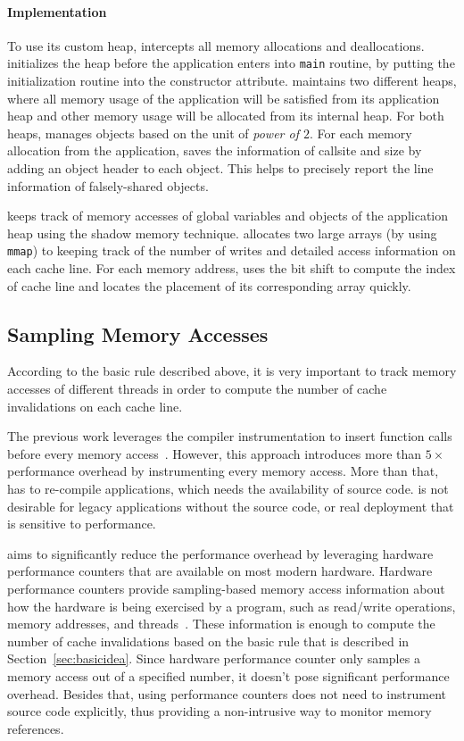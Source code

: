 \paragraph{Implementation} 
To use its custom heap, \cheetah{} intercepts all memory allocations and deallocations. \cheetah{} initializes the heap before the application enters into \texttt{main} routine, by putting the initialization routine into the constructor attribute. \cheetah{} maintains two different heaps, where all memory usage of the application will be satisfied from its application heap and other memory usage will be allocated from its  internal heap. For both heaps, \cheetah{} manages objects based on the unit of {\it power of $2$}. For each memory allocation from the application, \cheetah{} saves the information of callsite and size by adding an object header to each object. This helps \cheetah{} to precisely report the line information of falsely-shared objects.  

\cheetah{} keeps track of memory accesses of global variables and objects of the application heap using the shadow memory technique. \Cheetah{} allocates two large arrays (by using \texttt{mmap}) to keeping track of the number of writes and detailed access information on each cache line. For each memory address, \cheetah{} uses the bit shift to compute the index of cache line and locates the placement of its corresponding array quickly. 

\subsection{Sampling Memory Accesses}
\label{sec:perfcounter}

According to the basic rule described above, it is very important to track memory accesses of different threads in order to compute the number of cache invalidations on each cache line. 

The previous work \Predator{} leverages the compiler instrumentation to insert function calls before every memory access~\cite{Predator}. However, this approach introduces more than $5\times$ performance overhead by instrumenting every memory access. More than that, \Predator{} has to re-compile applications, which needs the availability of source code. \Predator{} is not desirable for legacy applications without the source code, or real deployment that is sensitive to performance. 

\cheetah{} aims to significantly reduce the performance overhead by leveraging hardware performance counters that are available on most modern hardware. Hardware performance counters provide sampling-based memory access information about how the hardware is being exercised by a program, such as read/write operations, memory addresses, and threads~\cite{Mucci99papi}. These information is enough to compute the number of cache invalidations based on the basic rule that is described in Section~\ref{sec:basicidea}. Since hardware performance counter only samples a memory access out of a specified number, it doesn't pose significant performance overhead. 
Besides that, using performance counters does not need to instrument source code explicitly, thus providing a non-intrusive way to monitor memory references. 

